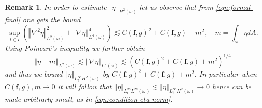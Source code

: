 \documentclass[10pt,a4paper]{article}
\newtheorem{remark}[theorem]{Remark}
\numberwithin{equation}{section}
\begin{document}
\begin{remark}\label{rmk:bound-eta-norm}
    In order to estimate $\left\Vert \eta\right\Vert _{H^{2}\left(\omega\right)}$ let us observe that from \eqref{eqn:formal-final} one gets the bound 
    \begin{equation}
        \sup_{t\in I}\left(\left\Vert \nabla^{2}\eta\right\Vert _{L^{2}\left(\omega\right)}^{2}+\left\Vert \nabla\eta\right\Vert _{L^{4}\left(\omega\right)}^{4}\right)\lesssim C\left(\mathbf{f},g\right)^{2}+C\left(\mathbf{f},g\right)+m^{2},\quad m=\int_{\omega}\eta dA.
    \end{equation}
    Using Poincar\'{e}'s inequality we further obtain 
    \begin{equation}
        \left\Vert \eta-m\right\Vert _{L^{2}\left(\omega\right)}\lesssim\left\Vert \nabla\eta\right\Vert _{L^{2}\left(\omega\right)}\lesssim\left(C\left(\mathbf{f},g\right)^{2}+C\left(\mathbf{f},g\right)+m^{2}\right)^{1/4}
    \end{equation}
and thus we  bound $\left\Vert \eta\right\Vert _{L_{t}^{\infty}H^{2}\left(\omega\right)}$ by $C\left(\mathbf{f},g\right)^{2}+C\left(\mathbf{f},g\right)+m^{2}$. In particular when $C\left(\mathbf{f},g\right),m\to0$ it will follow that $\left\Vert \eta\right\Vert _{L_{t}^{\infty}L^{\infty}\left(\omega\right)}\lesssim\left\Vert \eta\right\Vert _{L_{t}^{\infty}H^{2}\left(\omega\right)}\to0$ hence can be made arbitrarly small, as in \eqref{eqn:condition-eta-norm}.
    
\end{remark}
\end{document}
